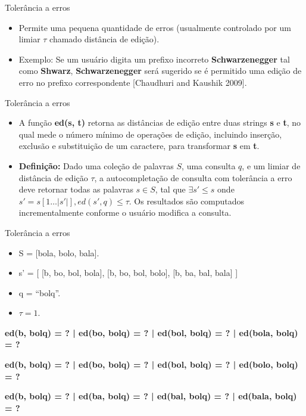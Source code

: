 \documentclass[11pt]{beamer}
\begin{document}
\begin{frame}{Tolerância a erros}
	\begin{itemize}
	    \justifying
		\item Permite uma pequena quantidade de erros (usualmente controlado por um limiar $\tau$ chamado distância de edição). \pause
		\item Exemplo: Se um usuário digita um prefixo incorreto \textbf{Schwarzenegger} tal como \textbf{Shwarz}, \textbf{Schwarzenegger} será sugerido se é permitido uma edição de erro no prefixo correspondente [Chaudhuri and Kaushik 2009]. 
	\end{itemize}
\end{frame}

\begin{frame}{Tolerância a erros}
	\begin{itemize}
		\item A função \textbf{ed(s, t)} retorna as distâncias de edição entre duas strings \textbf{s} e \textbf{t}, no qual mede o número mínimo de operações de edição, incluindo inserção, exclusão e substituição de um caractere, para transformar \textbf{s} em \textbf{t}. \pause
		\item \textbf{Definição:} Dado uma coleção de palavras $S$, uma consulta $q$, e um limiar de distância de edição $\tau$, a autocompletação de consulta com tolerância a erro deve retornar todas as palavras $s \in S$, tal que $\exists s' \leq s$ onde $s'=s[1 \ldots |s'|], ed(s', q) \leq \tau$. Os resultados são computados incrementalmente conforme o usuário modifica a consulta.
	\end{itemize}
\end{frame}

\begin{frame}{Tolerância a erros}
	\begin{itemize}
		\item S = [bola, bolo, bala]. 
		\item s’ = [ [b, bo, bol, bola], [b, bo, bol, bolo], [b, ba, bal, bala] ]
		\item q = ``bolq''.
		\item $\tau = 1$.
	\end{itemize}
	
	\pause
	\textbf{ed(b, bolq) = ? | ed(bo, bolq) = ? | ed(bol, bolq) = ? | ed(bola, bolq) = ?}
	
    \textbf{ed(b, bolq) = ? | ed(bo, bolq) = ? | ed(bol, bolq) = ? | ed(bolo, bolq) = ?}
    
    \textbf{ed(b, bolq) = ? | ed(ba, bolq) = ? | ed(bal, bolq) = ? | ed(bala, bolq) = ?}
\end{frame}
\end{document}
